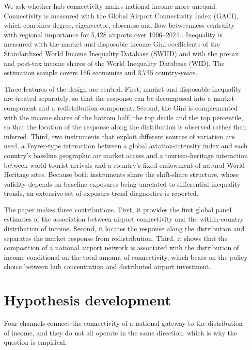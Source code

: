 \documentclass[12pt]{article}
\begin{document}
We ask whether hub connectivity makes national income more unequal. Connectivity is measured with the Global Airport Connectivity Index (GACI), which combines degree, eigenvector, closeness and flow-betweenness centrality with regional importance for 5,428 airports over 1996--2024 \citep{Cheung_2020}. Inequality is measured with the market and disposable income Gini coefficients of the Standardized World Income Inequality Database (SWIID) and with the pretax and post-tax income shares of the World Inequality Database (WID). The estimation sample covers 166 economies and 3,735 country-years.

Three features of the design are central. First, market and disposable inequality are treated separately, so that the response can be decomposed into a market component and a redistribution component. Second, the Gini is complemented with the income shares of the bottom half, the top decile and the top percentile, so that the location of the response along the distribution is observed rather than inferred. Third, two instruments that exploit different sources of variation are used, a Feyrer-type interaction between a global aviation-intensity index and each country's baseline geographic air market access \citep{Feyrer_2019} and a tourism-heritage interaction between world tourist arrivals and a country's fixed endowment of natural World Heritage sites. Because both instruments share the shift-share structure, whose validity depends on baseline exposures being unrelated to differential inequality trends, an extensive set of exposure-trend diagnostics is reported.

The paper makes three contributions. First, it provides the first global panel estimates of the association between airport connectivity and the within-country distribution of income. Second, it locates the response along the distribution and separates the market response from redistribution. Third, it shows that the composition of a national airport network is associated with the distribution of income conditional on the total amount of connectivity, which bears on the policy choice between hub concentration and distributed airport investment.

\section{Hypothesis development}
\label{sec:framework}
Four channels connect the connectivity of a national gateway to the distribution of income, and they do not all operate in the same direction, which is why the question is empirical.
\end{document}
